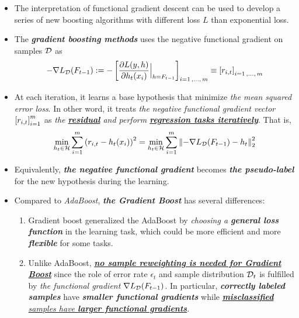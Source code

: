 \documentclass[11pt]{article}
\begin{document}
\begin{itemize}
\item The interpretation of functional gradient descent can be used to develop a series of new boosting algorithms with different loss $L$ than exponential loss.

\item The \emph{\textbf{gradient boosting methods}} uses the negative functional gradient on samples ${\mathcal D}$ as  
\begin{align}
-\nabla L_{{\mathcal D}}(F_{t-1}) := -\left[\frac{\partial L(y, h)}{ \partial h_t(x_i)}\Bigr|_{h = F_{t-1}}\right]_{i=1\,{,}\ldots{,}\,m} \equiv \left[r_{i,t}\right]_{i=1\,{,}\ldots{,}\,m} \label{eqn: grad_boost}
\end{align} 

\item At each iteration, it learns a base hypothesis that minimize \emph{the mean squared error loss}. In other word, it treats \emph{the negative functional gradient vector} $\left[r_{i,t}\right]_{i=1}^{m}$ as \emph{the \underline{\textbf{residual}} and perform \underline{\textbf{regression tasks iteratively}}}. That is,
\begin{align}
\min_{h_t \in {\mathcal H}} \sum_{i=1}^{m}\left(r_{i,t} - h_t(x_i)\right)^2 = \min_{h_t \in {\mathcal H}} \sum_{i=1}^{m}\left\|-\nabla L_{{\mathcal D}}(F_{t-1}) - h_t\right\|_{2}^2 \label{eqn: grad_boost_regression_task}
\end{align}

\item Equivalently,  \emph{\textbf{the negative functional gradient}} becomes \emph{\textbf{the pseudo-label}} for the new hypothesis during the learning. 

\item Compared to \emph{AdaBoost}, \emph{\textbf{the Gradient Boost}} has several differences:
\begin{enumerate}
\item Gradient boost generalized the AdaBoost by \emph{choosing a \textbf{general loss function}} in the learning task, which could be more efficient and more \emph{\textbf{flexible}} for some tasks. 

\item Unlike AdaBoost, \underline{\emph{\textbf{no sample reweighting is needed for Gradient Boost}}} since the role of error rate $\epsilon_t$ and sample distribution ${\mathcal D}_t$ is fulfilled by \emph{the functional gradient} $\nabla L_{{\mathcal D}}(F_{t-1})$. In particular, \emph{\textbf{correctly labeled samples}} have \emph{\textbf{smaller functional gradients}} while \emph{\underline{\textbf{misclassified} samples have \textbf{larger functional gradients}}}.


\end{enumerate}
\end{itemize}
\end{document}
